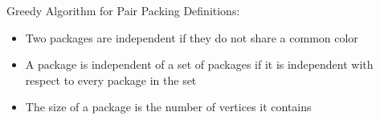 \begin{frame}{Greedy Algorithm for Pair Packing}
Definitions:
\begin{itemize}
\pause\item
Two packages are \alert{independent} if they do not share a common color

\pause\item
A package is \alert{independent} of a set of packages if it is independent with respect to every
package in the set  

\pause\item
The size of a package is the number of vertices it contains
\end{itemize}
\end{frame}